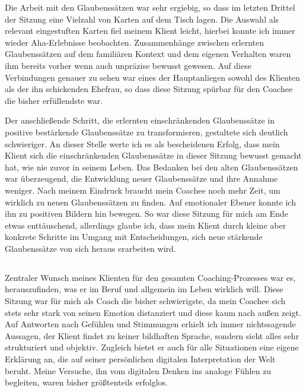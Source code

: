 \documentclass[11pt,a4paper]{article}
\begin{document}
Die Arbeit mit den Glaubenssätzen war sehr ergiebig, so dass im letzten Drittel der Sitzung eine Vielzahl von Karten auf dem Tisch lagen. Die Auswahl als relevant eingestuften Karten fiel meinem Klient leicht, hierbei konnte ich immer wieder Aha-Erlebnisse beobachten. Zusammenhänge zwischen erlernten Glaubenssätzen auf dem familiären Kontext und dem eigenen Verhalten waren ihm bereits vorher wenn auch unpräzise bewusst gewesen. Auf diese Verbindungen genauer zu sehen war eines der Hauptanliegen sowohl des Klienten als der ihn schickenden Ehefrau, so dass diese Sitzung spürbar für den Coachee die bisher erfüllendste war. 

Der anschließende Schritt, die erlernten einschränkenden Glaubenssätze in positive bestärkende Glaubenssätze zu transformieren, gestaltete sich deutlich schwieriger. An dieser Stelle werte ich es als bescheidenen Erfolg, dass mein Klient sich die einschränkenden Glaubenssätze in dieser Sitzung bewusst gemacht hat, wie nie zuvor in seinem Leben. Das Bedanken bei den alten Glaubenssätzen war überzeugend, die Entwicklung neuer Glaubenssätze und ihre Annahme weniger. Nach meinem Eindruck braucht mein Coachee noch mehr Zeit, um wirklich zu neuen Glaubenssätzen zu finden. Auf emotionaler Ebener konnte ich ihn zu positiven Bildern hin bewegen. So war diese Sitzung für mich am Ende etwas enttäuschend, allerdings glaube ich, dass mein Klient durch kleine aber konkrete Schritte im Umgang mit Entscheidungen, sich neue stärkende Glaubenssätze von sich heraus erarbeiten wird.





\subsection*{\color{Orange}{Vierte Sitzung: Identifikation der persönlichen Wünsche und Bedürfnisse}}


Zentraler Wunsch meines Klienten für den gesamten Coaching-Prozesses war es, herauszufinden, was er im Beruf und allgemein im Leben wirklich will. Diese Sitzung war für mich als Coach die bisher schwierigste, da mein Coachee sich stets sehr stark von seinen Emotion distanziert und diese kaum nach außen zeigt. Auf Antworten nach Gefühlen und  Stimmungen erhielt ich immer nichtssagende Aussagen, der Klient findet zu keiner bildhaften Sprache, sondern sieht alles sehr strukturiert und objektiv. Zugleich bietet er auch für alle Situationen eine eigene Erklärung an, die auf seiner persönlichen digitalen Interpretation der Welt beruht. Meine Versuche, ihn vom digitalen Denken ins analoge Fühlen zu begleiten, waren bisher größtenteils erfolglos. 
\end{document}
